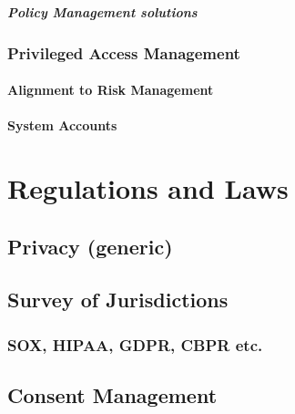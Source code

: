 \hypertarget{policy-management-solutions}{%
\paragraph{Policy Management
solutions}\label{policy-management-solutions}}

\hypertarget{privileged-access-management}{%
\subsection{Privileged Access
Management}\label{privileged-access-management}}

\hypertarget{alignment-to-risk-management}{%
\subsubsection{Alignment to Risk
Management}\label{alignment-to-risk-management}}

\hypertarget{system-accounts}{%
\subsubsection{System Accounts}\label{system-accounts}}

\hypertarget{regulations-and-laws}{%
\chapter{Regulations and Laws}\label{regulations-and-laws}}

\hypertarget{privacy-generic}{%
\section{Privacy (generic)}\label{privacy-generic}}

\hypertarget{survey-of-jurisdictions}{%
\section{Survey of Jurisdictions}\label{survey-of-jurisdictions}}

\hypertarget{sox-hipaa-gdpr-cbpr-etc.}{%
\subsection{SOX, HIPAA, GDPR, CBPR
etc.}\label{sox-hipaa-gdpr-cbpr-etc.}}

\hypertarget{consent-management}{%
\section{Consent Management}\label{consent-management}}

